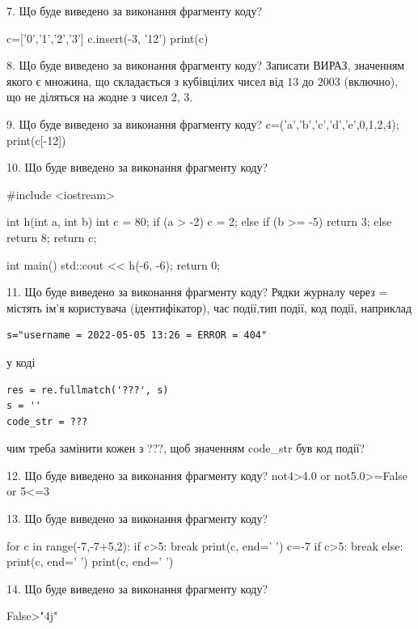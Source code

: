\documentclass[11pt]{article}
\begin{document}

7. Що буде виведено за виконання фрагменту коду?

c=['0','1','2','3']
c.insert(-3, '12')
print(c)



8. Що буде виведено за виконання фрагменту коду?
Записати ВИРАЗ, значенням якого є множина, що складається з кубівцілих чисел від 13 до 2003 (включно), що не діляться на жодне з чисел 2, 3.

9. Що буде виведено за виконання фрагменту коду?
c=('a','b','c','d','e',0,1,2,4); print(c[-12])

10. Що буде виведено за виконання фрагменту коду?

#include <iostream>

int h(int a, int b){
    int c = 80;
    if (a > -2)
        c = 2;
    else if (b >= -5)
         return 3;
    else 
        return 8;
    return c;
}

int main(){
    std::cout << h(-6, -6);
    return 0;
}


11. Що буде виведено за виконання фрагменту коду?
Рядки журналу через = містять ім'я користувача (ідентифікатор), час події,тип події, код події, наприклад
\begin{verbatim}
s="username = 2022-05-05 13:26 = ERROR = 404"
\end{verbatim}
у коді 
\begin{verbatim}
res = re.fullmatch('???', s) 
s = ''
code_str = ??? 
\end{verbatim}
чим треба замінити кожен з ???, щоб значенням code\_str був код події? 




12. Що буде виведено за виконання фрагменту коду?
not4>4.0 or not5.0>=False or 5<=3

13. Що буде виведено за виконання фрагменту коду?

for c in range(-7,-7+5,2):
    if c>5:
        break
    print(c, end=' ')
    c=-7
    if c>5:
        break
else:
    print(c, end=' ')
print(c, end=' ')


14. Що буде виведено за виконання фрагменту коду?

False>"4j"
\end{document}
